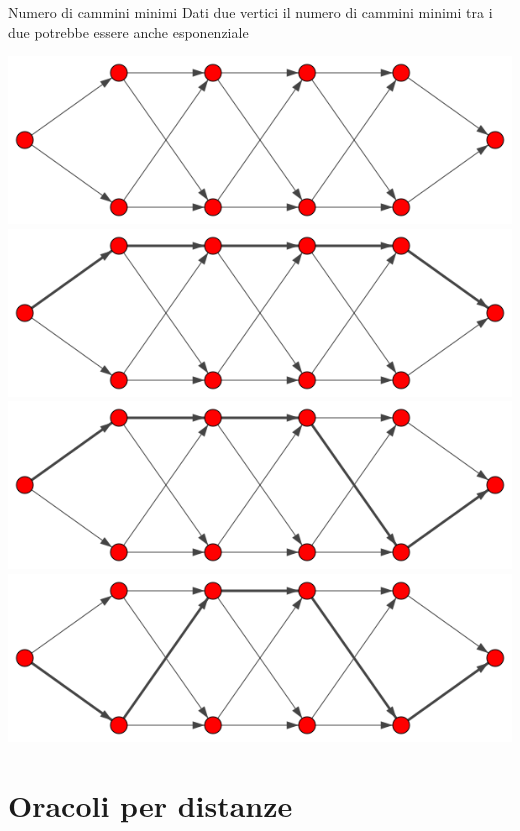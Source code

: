 \documentclass{beamer}
\theoremstyle{plain}
\theoremstyle{definition}
\theoremstyle{remark}
\begin{document}
\begin{frame}{Numero di cammini minimi}
  Dati due vertici il numero di cammini minimi tra i due potrebbe
  essere anche esponenziale
  \vfill

  \begin{overprint}
      \includegraphics[width=\textwidth]{catena0}
      \includegraphics[width=\textwidth]{catena1}
      \includegraphics[width=\textwidth]{catena2}
      \includegraphics[width=\textwidth]{catena3}
  \end{overprint}
\end{frame}


\section{Oracoli per distanze}
\end{document}
